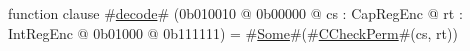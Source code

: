 function clause #\hyperref[sailMIPSzdecode]{decode}# (0b010010 @ 0b00000 @ cs : CapRegEnc @ rt : IntRegEnc @    0b01000 @ 0b111111) = #\hyperref[sailMIPSzSome]{Some}#(#\hyperref[sailMIPSzCCheckPerm]{CCheckPerm}#(cs, rt))
